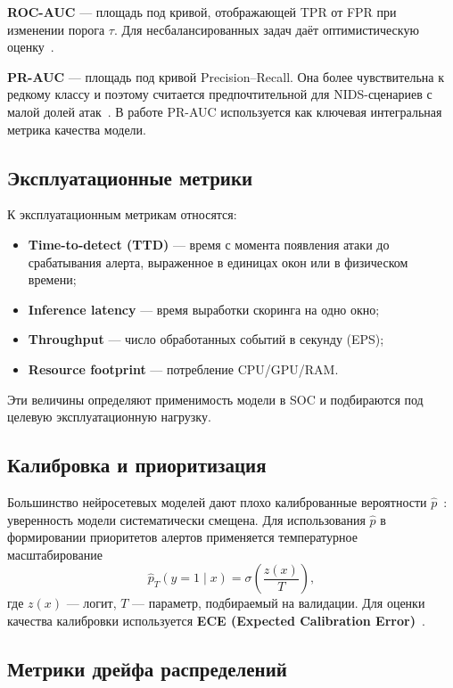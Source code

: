 \textbf{ROC-AUC} --- площадь под кривой, отображающей TPR от FPR при
изменении порога \(\tau\). Для несбалансированных задач даёт оптимистическую
оценку~\cite{khraisat2019survey, ahmad2021nids}.

\textbf{PR-AUC} --- площадь под кривой Precision--Recall. Она более
чувствительна к редкому классу и поэтому считается предпочтительной для
NIDS-сценариев с малой долей атак~\cite{liu2019survey}. В работе
PR-AUC используется как ключевая интегральная метрика качества модели.

\subsection{Эксплуатационные метрики}

К эксплуатационным метрикам относятся:
\begin{itemize}
    \item \textbf{Time-to-detect (TTD)} --- время с момента появления атаки до
    срабатывания алерта, выраженное в единицах окон или в физическом времени;
    \item \textbf{Inference latency} --- время выработки скоринга на одно
    окно;
    \item \textbf{Throughput} --- число обработанных событий в секунду
    (EPS);
    \item \textbf{Resource footprint} --- потребление CPU/GPU/RAM.
\end{itemize}
Эти величины определяют применимость модели в SOC и подбираются под целевую
эксплуатационную нагрузку.

\subsection{Калибровка и приоритизация}

Большинство нейросетевых моделей дают плохо калиброванные вероятности
\(\hat{p}\)~\cite{guo2017calibration}: уверенность модели систематически
смещена. Для использования \(\hat{p}\) в формировании приоритетов алертов
применяется температурное масштабирование
\begin{equation}
\hat{p}_{T}(y=1\mid x) =
\sigma\!\left(\frac{z(x)}{T}\right),
\label{eq:temp-scaling}
\end{equation}
где \(z(x)\) --- логит, \(T\) --- параметр, подбираемый на валидации.
Для оценки качества калибровки используется \textbf{ECE (Expected Calibration
Error)}~\cite{guo2017calibration}.

\subsection{Метрики дрейфа распределений}

